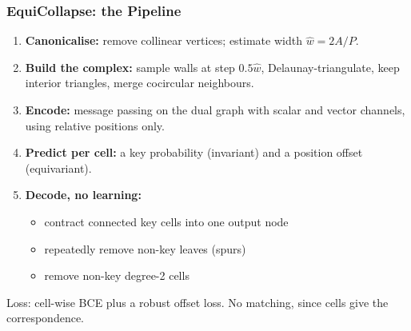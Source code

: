 \begin{frame}[fragile]\frametitle{EquiCollapse: the Pipeline}
\begin{enumerate}
\item \textbf{Canonicalise:} remove collinear vertices; estimate width $\hat{w} = 2A/P$.
\item \textbf{Build the complex:} sample walls at step $0.5\hat{w}$, Delaunay-triangulate, keep interior triangles, merge cocircular neighbours.
\item \textbf{Encode:} message passing on the dual graph with scalar and vector channels, using relative positions only.
\item \textbf{Predict per cell:} a key probability (invariant) and a position offset (equivariant).
\item \textbf{Decode, no learning:}
  \begin{itemize}
  \item contract connected key cells into one output node
  \item repeatedly remove non-key leaves (spurs)
  \item remove non-key degree-2 cells
  \end{itemize}
\end{enumerate}

\vspace{2pt}
Loss: cell-wise BCE plus a robust offset loss. No matching, since cells give the correspondence.
\end{frame}

